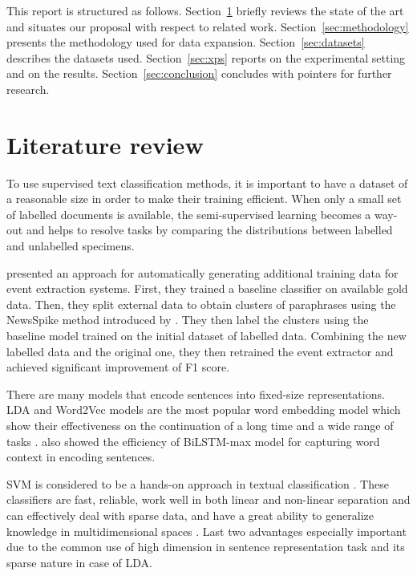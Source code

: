 \documentclass[11pt]{article}
\begin{document}
This report is structured as follows. Section~\ref{sec:relatedwork}
briefly reviews the state of the art and situates our proposal with
respect to related work.  Section~\ref{sec:methodology} presents the
methodology used for data expansion. Section~\ref{sec:datasets} describes
the datasets used. Section~\ref{sec:xps} reports on the experimental
setting and on the results. Section~\ref{sec:conclusion} concludes
with pointers for further research.

\section{Literature review}
\label{sec:relatedwork}

To use supervised text classification methods, it is important to have a dataset of a reasonable size in order to make their training efficient. When only a small set of labelled documents is available, the semi-supervised learning becomes a way-out and helps to resolve tasks by comparing the distributions between labelled and unlabelled specimens.

\cite{N18-2058} presented an approach for automatically generating additional training data for event extraction systems. First, they trained a baseline classifier on available gold data. Then, they split external data to obtain clusters of paraphrases using the NewsSpike method introduced by \cite{zhang2015}. They then label the clusters using the baseline model trained on the initial dataset of labelled data. Combining the new labelled data and the original one, they then retrained the event extractor and achieved significant improvement of F1 score.

There are many models that encode sentences into fixed-size representations. LDA and Word2Vec models are the most popular word embedding model which show their effectiveness on the continuation of a long time and a wide range of tasks\cite{Iacobacci2016EmbeddingsFW} \cite{Jelodar2017}. \cite{P18-1198} also showed the efficiency of BiLSTM-max model for capturing word context in encoding sentences.


SVM is considered to be a hands-on approach in textual classification \cite{SVM}. These classifiers are fast, reliable, work well in both linear and non-linear separation and can effectively deal with sparse data, and have a great ability to generalize knowledge in multidimensional spaces \cite{joachims98a}. Last two advantages especially important due to the common use of high dimension in sentence representation task and its sparse nature in case of LDA.
\end{document}
